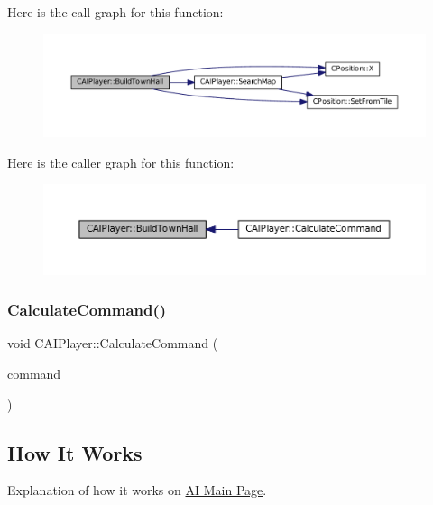 Here is the call graph for this function\+:
\nopagebreak
\begin{figure}[H]
\begin{center}
\leavevmode
\includegraphics[width=350pt]{classCAIPlayer_a41cdefbe14210fb70b793a32778c5141_cgraph}
\end{center}
\end{figure}
Here is the caller graph for this function\+:
\nopagebreak
\begin{figure}[H]
\begin{center}
\leavevmode
\includegraphics[width=350pt]{classCAIPlayer_a41cdefbe14210fb70b793a32778c5141_icgraph}
\end{center}
\end{figure}
\hypertarget{classCAIPlayer_ae2742efd250c7d6c00b659ccc29c4be3}{}\label{classCAIPlayer_ae2742efd250c7d6c00b659ccc29c4be3} 
\subsubsection{\texorpdfstring{Calculate\+Command()}{CalculateCommand()}}
{\footnotesize\ttfamily void C\+A\+I\+Player\+::\+Calculate\+Command (\begin{DoxyParamCaption}\item[{\hyperlink{structSPlayerCommandRequest}{S\+Player\+Command\+Request} \&}]{command }\end{DoxyParamCaption})}

\hypertarget{classCAIPlayer_cchow_sec}{}\subsection{How It Works}\label{classCAIPlayer_cchow_sec}
Explanation of how it works on \hyperlink{index}{AI Main Page}. 

